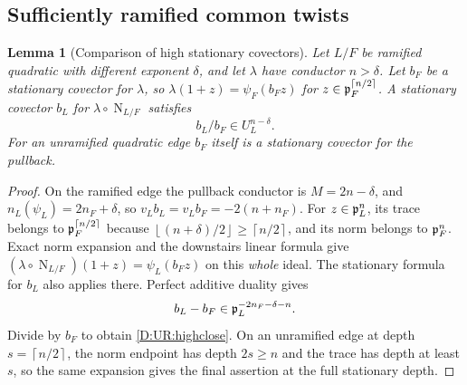 \documentclass[11pt]{amsart}
\newtheorem{lemma}[theorem]{Lemma}
\theoremstyle{definition}
\theoremstyle{remark}
\newcommand{\Nm}{\operatorname{N}}
\newcommand{\ceil}[1]{\left\lceil #1\right\rceil}
\newcommand{\floor}[1]{\left\lfloor #1\right\rfloor}
\begin{document}
\subsection{Sufficiently ramified common twists}
\begin{lemma}[Comparison of high stationary covectors]\label{D:UR:highcov}
Let $L/F$ be ramified quadratic with different exponent $\delta$, and let
$\lambda$ have conductor $n>\delta$. Let $b_F$ be a stationary covector
for $\lambda$, so $\lambda(1+z)=\psi_F(b_Fz)$ for
$z\in\pp_F^{\ceil{n/2}}$. A stationary covector $b_L$ for $\lambda\circ\Nm_{L/F}$
satisfies
\begin{equation}\label{D:UR:highclose}
 b_L/b_F\in U_L^{n-\delta}.
\end{equation}
For an unramified quadratic edge $b_F$ itself is a stationary covector
for the pullback.
\end{lemma}
\begin{proof}
On the ramified edge the pullback conductor is $M=2n-\delta$, and
$n_L(\psi_L)=2n_F+\delta$, so $v_Lb_L=v_Lb_F=-2(n+n_F)$.
For $z\in\mathfrak p_L^n$, its trace belongs to $\pp_F^{\ceil{n/2}}$ because
$\floor{(n+\delta)/2}\ge\ceil{n/2}$, and its norm belongs to $\mathfrak p_F^n$.
Exact norm expansion and the downstairs linear formula give
$(\lambda\circ\Nm_{L/F})(1+z)=\psi_L(b_Fz)$ on this \emph{whole} ideal.
The stationary formula for $b_L$ also applies there. Perfect additive
duality gives
\[
 b_L-b_F\in\mathfrak p_L^{-2n_F-\delta-n}.
\]
Divide by $b_F$ to obtain \eqref{D:UR:highclose}. On an unramified edge at depth
$s=\ceil{n/2}$, the norm endpoint has depth $2s\ge n$ and the trace has
depth at least $s$, so the same expansion gives the final assertion
at the full stationary depth.
\end{proof}
\end{document}
